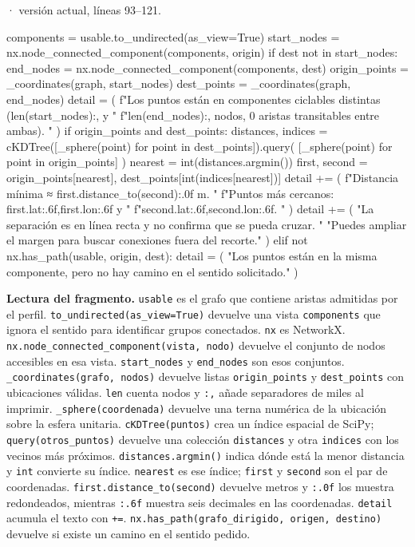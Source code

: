 \documentclass[11pt,a4paper]{article}
\begin{document}
\smallskip
{\footnotesize\texttt{} · versión actual, líneas 93--121.}\par
\begin{Codigo}[firstnumber=93]
    components = usable.to_undirected(as_view=True)
    start_nodes = nx.node_connected_component(components, origin)
    if dest not in start_nodes:
        end_nodes = nx.node_connected_component(components, dest)
        origin_points = _coordinates(graph, start_nodes)
        dest_points = _coordinates(graph, end_nodes)
        detail = (
            f"Los puntos están en componentes ciclables distintas ({len(start_nodes):,} y "
            f"{len(end_nodes):,} nodos, 0 aristas transitables entre ambas). "
        )
        if origin_points and dest_points:
            distances, indices = cKDTree([_sphere(point) for point in dest_points]).query(
                [_sphere(point) for point in origin_points]
            )
            nearest = int(distances.argmin())
            first, second = origin_points[nearest], dest_points[int(indices[nearest])]
            detail += (
                f"Distancia mínima ≈ {first.distance_to(second):.0f} m. "
                f"Puntos más cercanos: {first.lat:.6f},{first.lon:.6f} y "
                f"{second.lat:.6f},{second.lon:.6f}. "
            )
        detail += (
            "La separación es en línea recta y no confirma que se pueda cruzar. "
            "Puedes ampliar el margen para buscar conexiones fuera del recorte."
        )
    elif not nx.has_path(usable, origin, dest):
        detail = (
            "Los puntos están en la misma componente, pero no hay camino en el sentido solicitado."
        )
\end{Codigo}

\textbf{Lectura del fragmento.} \texttt{usable} es el grafo que contiene aristas admitidas por el perfil. \texttt{to\_undirected(as\_view=True)} devuelve una vista \texttt{components} que ignora el sentido para identificar grupos conectados. \texttt{nx} es NetworkX. \texttt{nx.node\_connected\_component(vista, nodo)} devuelve el conjunto de nodos accesibles en esa vista. \texttt{start\_nodes} y \texttt{end\_nodes} son esos conjuntos. \texttt{\_coordinates(grafo, nodos)} devuelve listas \texttt{origin\_points} y \texttt{dest\_points} con ubicaciones válidas. \texttt{len} cuenta nodos y \texttt{:,} añade separadores de miles al imprimir. \texttt{\_sphere(coordenada)} devuelve una terna numérica de la ubicación sobre la esfera unitaria. \texttt{cKDTree(puntos)} crea un índice espacial de SciPy; \texttt{query(otros\_puntos)} devuelve una colección \texttt{distances} y otra \texttt{indices} con los vecinos más próximos. \texttt{distances.argmin()} indica dónde está la menor distancia y \texttt{int} convierte su índice. \texttt{nearest} es ese índice; \texttt{first} y \texttt{second} son el par de coordenadas. \texttt{first.distance\_to(second)} devuelve metros y \texttt{:.0f} los muestra redondeados, mientras \texttt{:.6f} muestra seis decimales en las coordenadas. \texttt{detail} acumula el texto con \texttt{+=}. \texttt{nx.has\_path(grafo\_dirigido, origen, destino)} devuelve si existe un camino en el sentido pedido.
\end{document}
